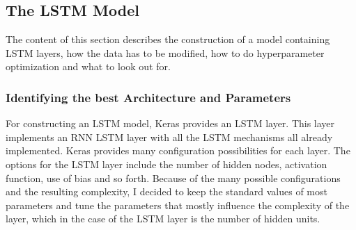 \subsection{The LSTM Model}
The content of this section describes the construction of a model containing LSTM layers, how the data has to be modified, how to do hyperparameter optimization and what to look out for.
\subsubsection{Identifying the best Architecture and Parameters}\label{archParam}
For constructing an LSTM model, Keras provides an LSTM layer.
This layer implements an RNN LSTM layer with all the LSTM mechanisms all already implemented.
Keras provides many configuration possibilities for each layer.
The options for the LSTM layer include the number of hidden nodes, activation function, use of bias and so forth.
Because of the many possible configurations and the resulting complexity, I decided to keep the standard values of most parameters and tune the parameters that mostly influence the complexity of the layer, which in the case of the LSTM layer is the number of hidden units.

